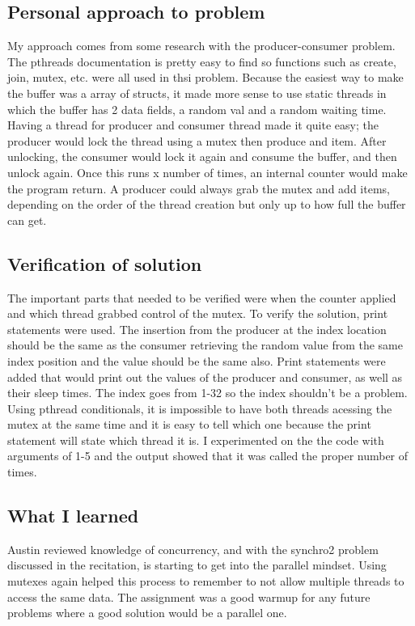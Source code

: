 \documentclass[letterpaper,10pt,titlepage]{article}
\begin{document}
\subsection{Personal approach to problem}
My approach comes from some research with the producer-consumer problem.  The pthreads documentation is pretty easy to find so functions such as create, join, mutex, etc. were all used in thsi problem.  Because the easiest way to make the buffer was a array of structs, it made more sense to use static threads in which the buffer has 2 data fields, a random val and a random waiting time.  Having a thread for producer and consumer thread made it quite easy; the producer would lock the thread using a mutex then produce and item.  After unlocking, the consumer would lock it again and consume the buffer, and then unlock again.  Once this runs x number of times, an internal counter would make the program return.  A producer could always grab the mutex and add items, depending on the order of the thread creation but only up to how full the buffer can get.

\subsection{Verification of solution}
The important parts that needed to be verified were when the counter applied and which thread grabbed control of the mutex.  To verify the solution, print statements were used.  The insertion from the producer at the index location should be the same as the consumer retrieving the random value from the same index position and the value should be the same also. Print statements were added that would print out the values of the producer and consumer, as well as their sleep times.  The index goes from 1-32 so the index shouldn't be a problem.  Using pthread conditionals, it is impossible to have both threads acessing the mutex at the same time and it is easy to tell which one because the print statement will state which thread it is. I experimented on the the code with arguments of 1-5 and the output showed that it was called the proper number of times.

\subsection{What I learned}
Austin reviewed knowledge of concurrency, and with the synchro2 problem discussed in the recitation, is starting to get into the parallel mindset. Using mutexes again helped this process to remember to not allow multiple threads to access the same data.  The assignment was a good warmup for any future problems where a good solution would be a parallel one.
\end{document}
